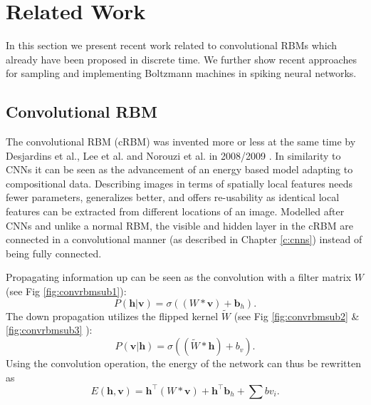 \chapter{Related Work} \label{c:relwork}

In this section we present recent work related to convolutional RBMs which already have been proposed in discrete time.
We further show recent approaches for sampling and implementing Boltzmann machines in spiking neural networks.

\section{Convolutional RBM} \label{c:convrbm}

The convolutional RBM (cRBM) was invented more or less at the same time by Desjardins et al., Lee et al. and Norouzi et al. in 2008/2009 \cite{desjardins2008empirical}\cite{lee2009convolutional}\cite{norouzi2009stacks}. 
In similarity to CNNs it can be seen as the advancement of an energy based model adapting to compositional data.
Describing images in terms of spatially local features needs fewer parameters, generalizes better, and offers re-usability as identical local features can be extracted from different locations of an image.
Modelled after CNNs and unlike a normal RBM, the visible and hidden layer in the cRBM are connected in a convolutional manner (as described in Chapter \ref{c:cnns}) instead of being fully connected.


Propagating information up can be seen as the convolution with a filter matrix $W$ (see Fig \ref{fig:convrbmsub1}): 
\[
P(\textbf{h} | \textbf{v}) = \sigma((W * \textbf{v}) + \textbf{b}_{h}).
\]
The down propagation utilizes the flipped kernel $\tilde{W}$  (see Fig \ref{fig:convrbmsub2} \& \ref{fig:convrbmsub3} ):
\[
P(\textbf{v}| \textbf{h}) = \sigma((\tilde{W} * \textbf{h}) + b_v).
\]
Using the convolution operation, the energy of the network can thus be rewritten as
\[
E(\textbf{h} , \textbf{v}) = \textbf{h}^\intercal(W * \textbf{v}) + \textbf{h}^\intercal \textbf{b}_{h} + \sum b v_i.
\]



